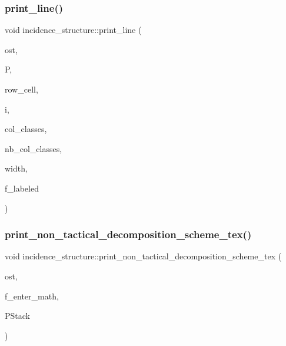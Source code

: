 \mbox{\label{classincidence__structure_ae76fdf2cf39ba776ed86b0b910d7746a}} 
\subsubsection{\texorpdfstring{print\+\_\+line()}{print\_line()}}
{\footnotesize\ttfamily void incidence\+\_\+structure\+::print\+\_\+line (\begin{DoxyParamCaption}\item[{ostream \&}]{ost,  }\item[{\mbox{\hyperlink{classpartitionstack}{partitionstack}} \&}]{P,  }\item[{\mbox{\hyperlink{galois_8h_a09fddde158a3a20bd2dcadb609de11dc}{I\+NT}}}]{row\+\_\+cell,  }\item[{\mbox{\hyperlink{galois_8h_a09fddde158a3a20bd2dcadb609de11dc}{I\+NT}}}]{i,  }\item[{\mbox{\hyperlink{galois_8h_a09fddde158a3a20bd2dcadb609de11dc}{I\+NT}} $\ast$}]{col\+\_\+classes,  }\item[{\mbox{\hyperlink{galois_8h_a09fddde158a3a20bd2dcadb609de11dc}{I\+NT}}}]{nb\+\_\+col\+\_\+classes,  }\item[{\mbox{\hyperlink{galois_8h_a09fddde158a3a20bd2dcadb609de11dc}{I\+NT}}}]{width,  }\item[{\mbox{\hyperlink{galois_8h_a09fddde158a3a20bd2dcadb609de11dc}{I\+NT}}}]{f\+\_\+labeled }\end{DoxyParamCaption})}

\mbox{\label{classincidence__structure_a27995a1d72c680e66343d871d838800e}} 
\subsubsection{\texorpdfstring{print\+\_\+non\+\_\+tactical\+\_\+decomposition\+\_\+scheme\+\_\+tex()}{print\_non\_tactical\_decomposition\_scheme\_tex()}}
{\footnotesize\ttfamily void incidence\+\_\+structure\+::print\+\_\+non\+\_\+tactical\+\_\+decomposition\+\_\+scheme\+\_\+tex (\begin{DoxyParamCaption}\item[{ostream \&}]{ost,  }\item[{\mbox{\hyperlink{galois_8h_a09fddde158a3a20bd2dcadb609de11dc}{I\+NT}}}]{f\+\_\+enter\+\_\+math,  }\item[{\mbox{\hyperlink{classpartitionstack}{partitionstack}} \&}]{P\+Stack }\end{DoxyParamCaption})}


